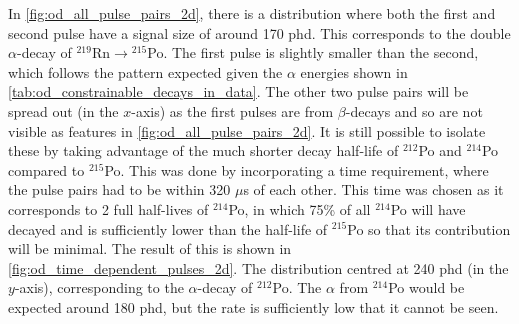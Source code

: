 

\par
In \autoref{fig:od_all_pulse_pairs_2d}, there is a distribution where both the first and second pulse have a signal size of around 170 phd.
This corresponds to the double $\alpha$-decay of ${}^{219}$Rn$\to{}^{215}$Po.
The first pulse is slightly smaller than the second, which follows the pattern expected given the $\alpha$ energies shown in \autoref{tab:od_constrainable_decays_in_data}.
The other two pulse pairs will be spread out (in the $x$-axis) as the first pulses are from $\beta$-decays and so are not visible as features in \autoref{fig:od_all_pulse_pairs_2d}.
It is still possible to isolate these by taking advantage of the much shorter decay half-life of ${}^{212}$Po and ${}^{214}$Po compared to ${}^{215}$Po.
This was done by incorporating a time requirement, where the pulse pairs had to be within 320 $\mu$s of each other.
This time was chosen as it corresponds to 2 full half-lives of ${}^{214}$Po, in which 75\% of all ${}^{214}$Po will have decayed and is sufficiently lower than the half-life of ${}^{215}$Po so that its contribution will be minimal.
The result of this is shown in \autoref{fig:od_time_dependent_pulses_2d}.
The distribution centred at 240 phd (in the $y$-axis), corresponding to the $\alpha$-decay of ${}^{212}$Po.
The $\alpha$ from ${}^{214}$Po would be expected around 180 phd, but the rate is sufficiently low that it cannot be seen.

